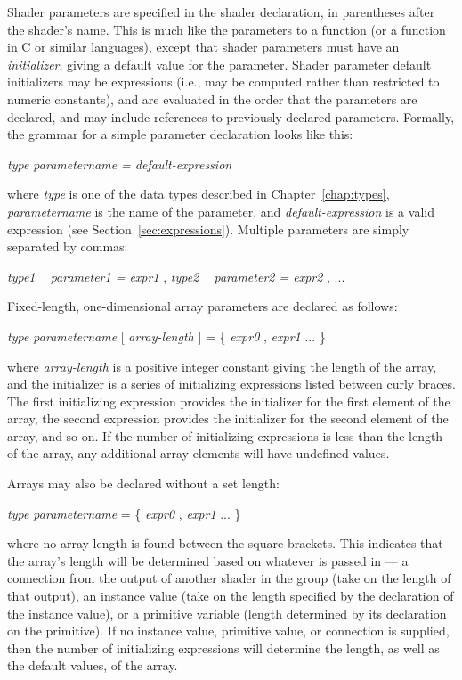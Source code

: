 \documentclass[11pt,letterpaper]{book}
\begin{document}
Shader parameters are specified in the shader declaration, in
parentheses after the shader's name.  This is much like the parameters
to a \languagename function (or a function in C or similar languages),
except that shader parameters must have an \emph{initializer}, giving a
default value for the parameter.  Shader parameter default initializers
may be expressions (i.e., may be computed rather than restricted to
numeric constants), and are evaluated in the order that the parameters
are declared, and may include references to previously-declared
parameters.  Formally, the grammar for a simple parameter
declaration looks like this:

\medskip
\spc \emph{type parametername = default-expression} 
\medskip

\noindent where \emph{type} is one of the data types described
in Chapter~\ref{chap:types}, \emph{parametername} is the name of the
parameter, and \emph{default-expression} is a valid expression
(see Section~\ref{sec:expressions}).  Multiple parameters are 
simply separated by commas:

\medskip
\spc \emph{type1 ~ parameter1 = expr1} {\cf ,} \emph{type2 ~ parameter2 = expr2} {\cf ,} ...
\medskip


Fixed-length, one-dimensional array parameters are declared as follows:

\medskip
\spc \emph{type parametername} {\cf [ } \emph{array-length} {\cf ] = \{ } \emph{expr0}
  {\cf ,} \emph{expr1} ... {\cf \} }
\medskip

\noindent where \emph{array-length} is a positive integer constant
giving the length of the array, and the initializer is a series of
initializing expressions listed between curly braces.  The first
initializing expression provides the initializer for the first element
of the array, the second expression provides the initializer for the
second element of the array, and so on.  If the number of initializing
expressions is less than the length of the array, any additional array
elements will have undefined values.

Arrays may also be declared without a set length:

\medskip
\spc \emph{type parametername} {\cf [ ] = \{ } \emph{expr0}
  {\cf ,} \emph{expr1} ... {\cf \} }
\medskip

\noindent where no array length is found between the square brackets.
This indicates that the array's length will be determined based on
whatever is passed in --- a connection from the output of another shader
in the group (take on the length of that output), an instance value
(take on the length specified by the declaration of the instance value),
or a primitive variable (length determined by its declaration on the
primitive).  If no instance value, primitive value, or connection is
supplied, then the number of initializing expressions will determine the
length, as well as the default values, of the array.
\end{document}
